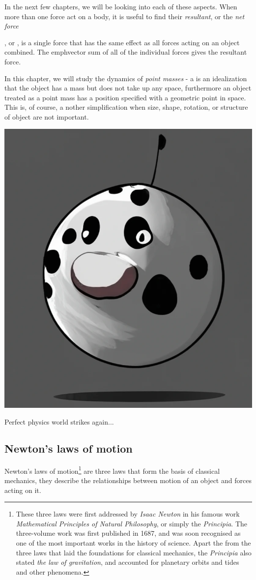 In the next few chapters, we will be looking into each of these aspects. When more than one force act on a body, it is useful to find their \emph{resultant}, or the \emph{net force}

\begin{ilight}
	, or , is a single force that has the same effect as all forces acting on an object combined. The emph{vector sum} of all of the individual forces gives the resultant force.
\end{ilight}

In this chapter, we will study the dynamics of \emph{point masses} - a  is an idealization that the object has a mass but does not take up any space, furthermore an object treated as a point mass has a position specified with a geometric point in space. This is, of course, a nother simplification when size, shape, rotation, or structure of object are not important.\begin{marginfigure}
        \includegraphics[width=0.5\linewidth]{sphericalcow.png}
        \caption{Perfect physics world strikes again...}
\end{marginfigure}

\subsection{Newton's laws of motion}

Newton's laws of motion\footnote{These three laws were first addressed by \emph{Isaac Newton} in his famous work \emph{Mathematical Principles of Natural Philosophy}, or simply the \emph{Principia}. The three-volume work was first published in 1687, and was soon recognised as one of the most important works in the history of science. Apart the from the three laws that laid the foundations for classical mechanics, the \emph{Principia} also stated \emph{the law of gravitation}, and accounted for planetary orbits and tides and other phenomena.} are three laws that form the basis of classical mechanics, they describe the relationships between motion of an object and forces acting on it.

